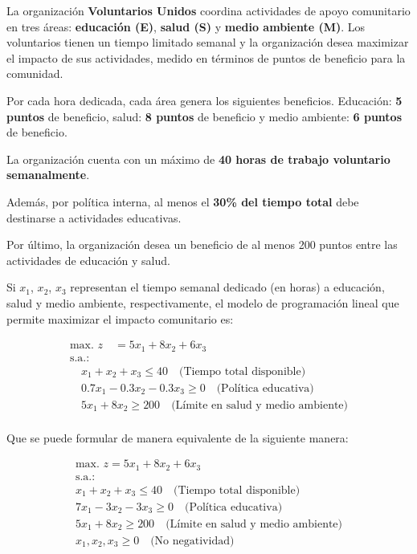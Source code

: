 La organización \textbf{Voluntarios Unidos} coordina actividades de apoyo comunitario en tres áreas: \textbf{educación (E)}, \textbf{salud (S)} y \textbf{medio ambiente (M)}. Los voluntarios tienen un tiempo limitado semanal y la organización desea maximizar el impacto de sus actividades, medido en términos de puntos de beneficio para la comunidad.

Por cada hora dedicada, cada área genera los siguientes beneficios. Educación: \textbf{5 puntos} de beneficio, salud: \textbf{8 puntos} de beneficio y medio ambiente: \textbf{6 puntos} de beneficio.

La organización cuenta con un máximo de \textbf{40 horas de trabajo voluntario semanalmente}. 

Además, por política interna, al menos el \textbf{30\% del tiempo total} debe destinarse a actividades educativas.

Por último, la organización desea un beneficio de al menos 200 puntos entre las actividades de educación y salud.

Si $x_1$, $x_2$, $x_3$ representan el tiempo semanal dedicado (en horas) a educación, salud y medio ambiente, respectivamente, el modelo de programación lineal que permite maximizar el impacto comunitario es:


\begin{equation}
\begin{split}
\text{max. } z \quad = 5x_1 + 8x_2 + 6x_3 \\
\text{s.a.:} \\
\quad x_1 + x_2 + x_3 \leq 40 \quad \text{(Tiempo total disponible)} \\
\quad 0.7x_1 - 0.3x_2 - 0.3x_3 \geq 0 \quad \text{(Política educativa)}\\
\quad 5x_1 + 8x_2 \geq 200 \quad \text{(Límite en salud y medio ambiente)} \\
\end{split}
\end{equation}


Que se puede formular de manera equivalente de la siguiente manera:


\begin{equation}
\begin{split}
\text{max. } z = 5x_1 + 8x_2 + 6x_3 \\
\text{s.a.:} \\
x_1 + x_2 + x_3 \leq 40 \quad \text{(Tiempo total disponible)} \\
7x_1 - 3x_2 - 3x_3 \geq 0 \quad \text{(Política educativa)} \\
5x_1 + 8x_2 \geq 200 \quad \text{(Límite en salud y medio ambiente)} \\
x_1, x_2, x_3 \geq 0 \quad \text{(No negatividad)}
\end{split}
\end{equation}

